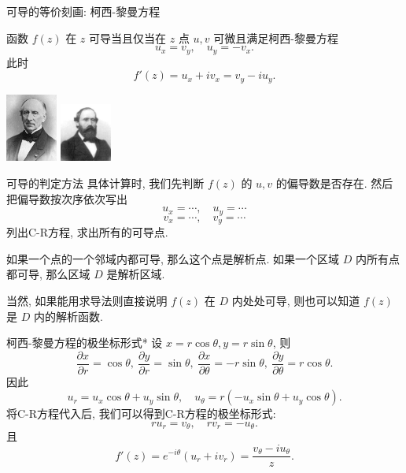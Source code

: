 \begin{frame}{可导的等价刻画: 柯西-黎曼方程}
\begin{conclusion}
函数 $f(z)$ 在 $z$ 可导当且仅当在 $z$ 点 $u,v$ 可微且满足柯西-黎曼方程
\[u_x=v_y,\quad u_y=-v_x.\]
\onslide<+->
此时
\[f'(z)=u_x+iv_x=v_y-iu_y.\]
\end{conclusion}
\onslide<+->
\begin{center}
\includegraphics[width=1.7cm]{misc/Cauchy.jpeg}
\hspace{2cm}\includegraphics[width=1.7cm]{misc/Riemann.jpeg}
\end{center}
\end{frame}


\begin{frame}{可导的判定方法}
\onslide<+->
具体计算时, 我们先判断 $f(z)$ 的 $u,v$ 的偏导数是否存在.
\onslide<+->
然后把偏导数按次序依次写出
\[u_x=\cdots,\quad u_y=\cdots\]
\[v_x=\cdots,\quad v_y=\cdots\]
列出C-R方程, 求出所有的可导点.

\onslide<+->
如果一个点的一个邻域内都可导, 那么这个点是解析点.
\onslide<+->
如果一个区域 $D$ 内所有点都可导, 那么区域 $D$ 是解析区域.

\onslide<+->
当然, 如果能用求导法则直接说明 $f(z)$ 在 $D$ 内处处可导, 则也可以知道 $f(z)$ 是 $D$ 内的解析函数.
\end{frame}


\begin{frame}{柯西-黎曼方程的极坐标形式*}
\onslide<+->
设 $x=r\cos \theta,y=r\sin\theta$,
\onslide<+->
则
\[\frac{\partial x}{\partial r}=\cos\theta,\ 
\frac{\partial y}{\partial r}=\sin\theta,\ 
\frac{\partial x}{\partial \theta}=-r\sin\theta,\ 
\frac{\partial y}{\partial \theta}=r\cos\theta.\]
\onslide<+->
因此
\[u_r=u_x\cos\theta+u_y\sin\theta,\quad
u_\theta=r(-u_x\sin\theta+u_y\cos\theta).\]
\onslide<+->
将C-R方程代入后, 我们可以得到C-R方程的极坐标形式:
\[ru_r=v_\theta,\quad rv_r=-u_\theta.\]
\onslide<+->
且
\[f'(z)=e^{-i\theta}(u_r+iv_r)=\frac{v_\theta-i u_\theta}z.\]
\end{frame}


